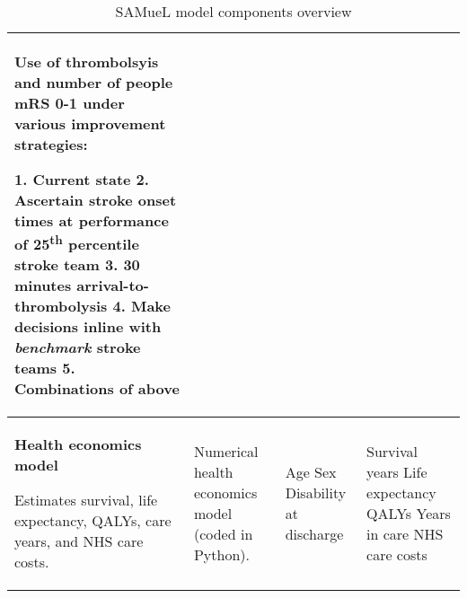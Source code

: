 \begin{landscape}
{\begin{table}
\begin{tabular}{|p{5cm}|p{5cm}|p{6cm}|p{6cm}|}
Use of thrombolsyis and number of people mRS 0-1 under various improvement strategies:\newline\vspace{4pt}

1. Current state\newline\vspace{2pt}
2. Ascertain stroke onset times at performance of 25\textsuperscript{th} percentile stroke team\newline\vspace{2pt}
3. 30 minutes arrival-to-thrombolysis\newline\vspace{2pt}
4. Make decisions inline with \textit{benchmark} stroke teams\newline\vspace{2pt}
5. Combinations of above\newline\vspace{2pt}\\

\hline


\textbf{Health economics model}

\vspace{3mm}

Estimates survival, life expectancy, QALYs, care years, and NHS care costs. &

Numerical health economics model (coded in Python). &

Age\newline\vspace{2pt}
Sex\newline\vspace{2pt}
Disability at discharge &

Survival years\newline\vspace{2pt}
Life expectancy\newline\vspace{2pt}
QALYs\newline\vspace{2pt}
Years in care\newline\vspace{2pt}
NHS care costs\newline\vspace{2pt}\\





\hline


\end{tabular}
\caption{SAMueL model components overview}
\label{tab:example}
\end{table}
}
\end{landscape}